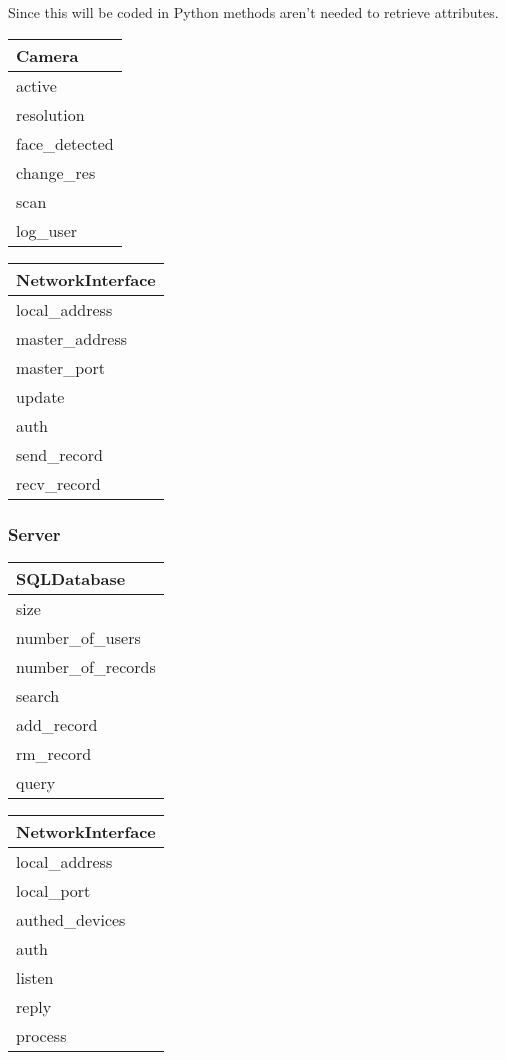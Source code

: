 \documentclass[12pt,a4paper]{report}
\begin{document}
Since this will be coded in Python methods aren't needed to 
retrieve attributes.



\begin{tabular}[h]{|l|}
\hline
\textbf{Camera} \\
\hline
active \\
\hline
resolution \\
\hline
face\_detected \\
\hline
change\_res \\
\hline
scan \\
\hline
log\_user \\
\hline
\end{tabular}


\begin{tabular}{|l|}
\hline
\textbf{NetworkInterface} \\
\hline
local\_address \\
\hline
master\_address \\
\hline
master\_port \\
\hline
update \\
\hline
auth \\
\hline
send\_record \\
\hline
recv\_record \\
\hline
\end{tabular}


\subsubsection{Server}\label{section:_Toc370402520}


\begin{tabular}{|l|}
\hline
\textbf{SQLDatabase} \\
\hline
size \\
\hline
number\_of\_users \\
\hline
number\_of\_records \\
\hline
search \\
\hline
add\_record \\
\hline
rm\_record \\
\hline
query \\
\hline
\end{tabular}


\begin{tabular}{|l|}
\hline
\textbf{NetworkInterface} \\
\hline
local\_address \\
\hline
local\_port \\
\hline
authed\_devices \\
\hline
auth \\
\hline
listen \\
\hline
reply \\
\hline
process \\
\hline
\end{tabular}
\end{document}
